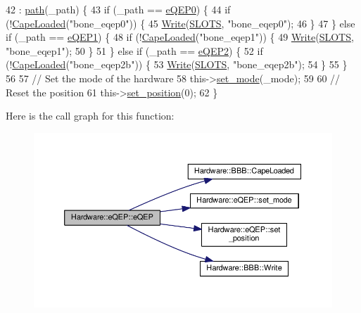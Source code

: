 \begin{DoxyCode}
42                                                : \hyperlink{class_hardware_1_1e_q_e_p_a82718bc8478cde37f28fc685a859525e}{path}(\_path) \{
43   \textcolor{keywordflow}{if} (\_path == \hyperlink{eqep_8h_a6b7cf82bbc86508b5df1d751c202e601}{eQEP0}) \{
44     \textcolor{keywordflow}{if} (!\hyperlink{class_hardware_1_1_b_b_b_aaf2f732c771eac0b1ee984dbc0bca784}{CapeLoaded}(\textcolor{stringliteral}{"bone\_eqep0"})) \{
45       \hyperlink{class_hardware_1_1_b_b_b_a155cc06f76d82a6b690ce5ea08e7c68e}{Write}(\hyperlink{_b_b_b_8h_a3de26a5dbd2276c1486afbba5fc8de59}{SLOTS}, \textcolor{stringliteral}{"bone\_eqep0"});
46     \}
47   \} \textcolor{keywordflow}{else} \textcolor{keywordflow}{if} (\_path == \hyperlink{eqep_8h_a490269705de1a8a0cc6d52c6cdbaa422}{eQEP1}) \{
48     \textcolor{keywordflow}{if} (!\hyperlink{class_hardware_1_1_b_b_b_aaf2f732c771eac0b1ee984dbc0bca784}{CapeLoaded}(\textcolor{stringliteral}{"bone\_eqep1"})) \{
49       \hyperlink{class_hardware_1_1_b_b_b_a155cc06f76d82a6b690ce5ea08e7c68e}{Write}(\hyperlink{_b_b_b_8h_a3de26a5dbd2276c1486afbba5fc8de59}{SLOTS}, \textcolor{stringliteral}{"bone\_eqep1"});
50     \}
51   \} \textcolor{keywordflow}{else} \textcolor{keywordflow}{if} (\_path == \hyperlink{eqep_8h_a2dfbafc696aef9c14226ce25fb77c5f1}{eQEP2}) \{
52     \textcolor{keywordflow}{if} (!\hyperlink{class_hardware_1_1_b_b_b_aaf2f732c771eac0b1ee984dbc0bca784}{CapeLoaded}(\textcolor{stringliteral}{"bone\_eqep2b"})) \{
53       \hyperlink{class_hardware_1_1_b_b_b_a155cc06f76d82a6b690ce5ea08e7c68e}{Write}(\hyperlink{_b_b_b_8h_a3de26a5dbd2276c1486afbba5fc8de59}{SLOTS}, \textcolor{stringliteral}{"bone\_eqep2b"});
54     \}
55   \}
56 
57   \textcolor{comment}{// Set the mode of the hardware}
58   this->\hyperlink{class_hardware_1_1e_q_e_p_a137d1fb0b0e5772487ece48254342294}{set\_mode}(\_mode);
59 
60   \textcolor{comment}{// Reset the position}
61   this->\hyperlink{class_hardware_1_1e_q_e_p_aa55fc881377f4fc3396895de65ed9161}{set\_position}(0);
62 \}
\end{DoxyCode}


Here is the call graph for this function\+:\nopagebreak
\begin{figure}[H]
\begin{center}
\leavevmode
\includegraphics[width=350pt]{class_hardware_1_1e_q_e_p_adc9ce642c8927e217afc3600a63002e5_cgraph}
\end{center}
\end{figure}




